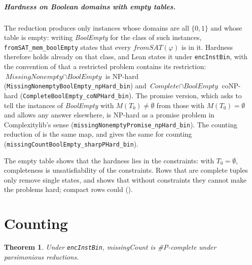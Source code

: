 \documentclass[pdflatex,sn-mathphys-num]{sn-jnl}
\theoremstyle{thmstyleone}
\newtheorem{theorem}{Theorem}
\theoremstyle{thmstylethree}
\begin{document}
\subparagraph*{Hardness on Boolean domains with empty tables.}
The reduction produces only instances whose domains are all $\{0,1\}$ and whose table is empty:
writing \textit{BoolEmpty} for the class of such instances, \lstinline{fromSAT_mem_boolEmpty}
states that every $\mathit{fromSAT}(\varphi)$ is in it. Hardness therefore holds already on
that class, and Lean states it under \lstinline{encInstBin}, with the convention of
 that a restricted problem contains its restriction:
$\textit{MissingNonempty} \cap \textit{BoolEmpty}$ is NP-hard
(\lstinline{MissingNonemptyBoolEmpty_npHard_bin}) and $\textit{Complete} \cap
\textit{BoolEmpty}$ coNP-hard (\lstinline{CompleteBoolEmpty_coNPHard_bin}). The promise
version, which asks to tell the instances of \textit{BoolEmpty} with $M(T_0) \neq \emptyset$
from those with $M(T_0) = \emptyset$ and allows any answer elsewhere, is NP-hard as a promise
problem in Complexitylib's sense (\lstinline{missingNonemptyPromise_npHard_bin}). The counting
reduction of  is the same map, and gives the same for counting
(\lstinline{missingCountBoolEmpty_sharpPHard_bin}).

The empty table shows that the hardness lies in the constraints: with $T_0 = \emptyset$,
completeness is unsatisfiability of the constraints. Rows that are complete tuples only remove
single states, and  shows that without constraints they cannot make the
problems hard; compact rows could ().

\section{Counting}
\label{sec:counting}

\begin{theorem}
\label{thm:counting}
Under \lstinline{encInstBin}, \textit{missingCount} is \#P-complete under parsimonious
reductions.
\end{theorem}
\end{document}
